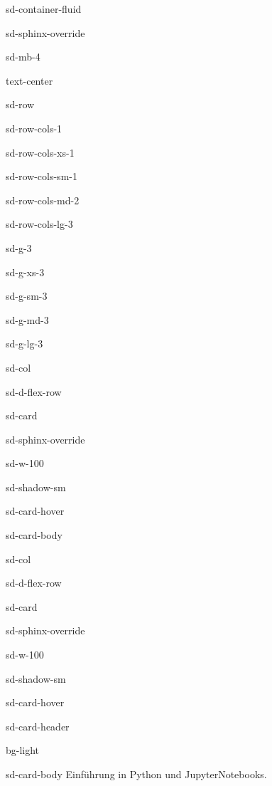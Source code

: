 \documentclass[letterpaper,10pt,english]{jupyterBook}
\begin{document}
\begin{sphinxuseclass}{sd-container-fluid}
\begin{sphinxuseclass}{sd-sphinx-override}
\begin{sphinxuseclass}{sd-mb-4}
\begin{sphinxuseclass}{text-center}
\begin{sphinxuseclass}{sd-row}
\begin{sphinxuseclass}{sd-row-cols-1}
\begin{sphinxuseclass}{sd-row-cols-xs-1}
\begin{sphinxuseclass}{sd-row-cols-sm-1}
\begin{sphinxuseclass}{sd-row-cols-md-2}
\begin{sphinxuseclass}{sd-row-cols-lg-3}
\begin{sphinxuseclass}{sd-g-3}
\begin{sphinxuseclass}{sd-g-xs-3}
\begin{sphinxuseclass}{sd-g-sm-3}
\begin{sphinxuseclass}{sd-g-md-3}
\begin{sphinxuseclass}{sd-g-lg-3}
\begin{sphinxuseclass}{sd-col}
\begin{sphinxuseclass}{sd-d-flex-row}
\begin{sphinxuseclass}{sd-card}
\begin{sphinxuseclass}{sd-sphinx-override}
\begin{sphinxuseclass}{sd-w-100}
\begin{sphinxuseclass}{sd-shadow-sm}
\begin{sphinxuseclass}{sd-card-hover}
\begin{sphinxuseclass}{sd-card-body}
\end{sphinxuseclass}{\hyperref[\detokenize{content/1_Datenanalyse::doc}]{}}
\end{sphinxuseclass}
\end{sphinxuseclass}
\end{sphinxuseclass}
\end{sphinxuseclass}
\end{sphinxuseclass}
\end{sphinxuseclass}
\end{sphinxuseclass}
\begin{sphinxuseclass}{sd-col}
\begin{sphinxuseclass}{sd-d-flex-row}
\begin{sphinxuseclass}{sd-card}
\begin{sphinxuseclass}{sd-sphinx-override}
\begin{sphinxuseclass}{sd-w-100}
\begin{sphinxuseclass}{sd-shadow-sm}
\begin{sphinxuseclass}{sd-card-hover}
\begin{sphinxuseclass}{sd-card-header}
\begin{sphinxuseclass}{bg-light}
\sphinxAtStartPar
{} 🐍

\end{sphinxuseclass}
\end{sphinxuseclass}
\begin{sphinxuseclass}{sd-card-body}
\sphinxAtStartPar
Einführung in Python und Jupyter\sphinxhyphen{}Notebooks.


\end{sphinxuseclass}
\end{sphinxuseclass}
\end{sphinxuseclass}
\end{sphinxuseclass}
\end{sphinxuseclass}
\end{sphinxuseclass}
\end{sphinxuseclass}
\end{sphinxuseclass}
\end{sphinxuseclass}
\end{sphinxuseclass}
\end{sphinxuseclass}
\end{sphinxuseclass}
\end{sphinxuseclass}
\end{sphinxuseclass}
\end{sphinxuseclass}
\end{sphinxuseclass}
\end{sphinxuseclass}
\end{sphinxuseclass}
\end{sphinxuseclass}
\end{sphinxuseclass}
\end{sphinxuseclass}
\end{sphinxuseclass}
\end{sphinxuseclass}
\end{document}
